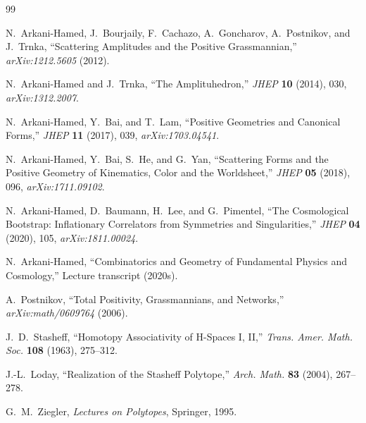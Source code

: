 \documentclass[12pt, oneside]{amsart}
\theoremstyle{plain}
\theoremstyle{definition}
\theoremstyle{remark}
\begin{document}
\begin{thebibliography}{99}


N.~Arkani-Hamed, J.~Bourjaily, F.~Cachazo, A.~Goncharov, A.~Postnikov, and J.~Trnka,
\newblock ``Scattering Amplitudes and the Positive Grassmannian,''
\newblock \textit{arXiv:1212.5605} (2012).

N.~Arkani-Hamed and J.~Trnka,
\newblock ``The Amplituhedron,''
\newblock \textit{JHEP} \textbf{10} (2014), 030,
\newblock \textit{arXiv:1312.2007}.

N.~Arkani-Hamed, Y.~Bai, and T.~Lam,
\newblock ``Positive Geometries and Canonical Forms,''
\newblock \textit{JHEP} \textbf{11} (2017), 039,
\newblock \textit{arXiv:1703.04541}.

N.~Arkani-Hamed, Y.~Bai, S.~He, and G.~Yan,
\newblock ``Scattering Forms and the Positive Geometry of Kinematics, Color and the Worldsheet,''
\newblock \textit{JHEP} \textbf{05} (2018), 096,
\newblock \textit{arXiv:1711.09102}.

N.~Arkani-Hamed, D.~Baumann, H.~Lee, and G.~Pimentel,
\newblock ``The Cosmological Bootstrap: Inflationary Correlators from Symmetries and Singularities,''
\newblock \textit{JHEP} \textbf{04} (2020), 105,
\newblock \textit{arXiv:1811.00024}.

N.~Arkani-Hamed,
\newblock ``Combinatorics and Geometry of Fundamental Physics and Cosmology,''
\newblock Lecture transcript (2020s).


A.~Postnikov,
\newblock ``Total Positivity, Grassmannians, and Networks,''
\newblock \textit{arXiv:math/0609764} (2006).

J.~D.~Stasheff,
\newblock ``Homotopy Associativity of H-Spaces I, II,''
\newblock \textit{Trans. Amer. Math. Soc.} \textbf{108} (1963), 275--312.

J.-L.~Loday,
\newblock ``Realization of the Stasheff Polytope,''
\newblock \textit{Arch. Math.} \textbf{83} (2004), 267--278.

G.~M.~Ziegler,
\newblock \textit{Lectures on Polytopes},
\newblock Springer, 1995.


\end{thebibliography}
\end{document}
